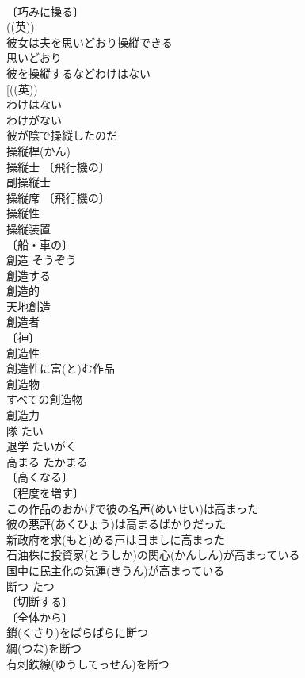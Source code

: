 \documentclass[8pt]{extreport}
\begin{document}
\begin{CJK}{UTF8}{min}
\\	〔巧みに操る〕
\\	((英)) 
\\	彼女は夫を思いどおり操縦できる 
\\	思いどおり　
\\	彼を操縦するなどわけはない
\\	[((英)) 
\\	わけはない　
\\	わけがない　
\\	彼が陰で操縦したのだ 
\\	操縦桿(かん) 
\\	操縦士 〔飛行機の〕
\\	副操縦士 
\\	操縦席 〔飛行機の〕
\\	操縦性 
\\	操縦装置 
\\	〔船・車の〕
\\	創造	そうぞう	
\\	創造する 
\\	創造的 
\\	天地創造 
\\	創造者 
\\	〔神〕
\\	創造性 
\\	創造性に富(と)む作品 
\\	創造物 
\\	すべての創造物 
\\	創造力 
\\	隊	たい	
\\	退学	たいがく	
\\	高まる	たかまる	
\\	〔高くなる〕
\\	〔程度を増す〕
\\	この作品のおかげで彼の名声(めいせい)は高まった 
\\	彼の悪評(あくひょう)は高まるばかりだった 
\\	新政府を求(もと)める声は日ましに高まった 
\\	石油株に投資家(とうしか)の関心(かんしん)が高まっている 
\\	国中に民主化の気運(きうん)が高まっている 
\\	断つ	たつ	
\\	〔切断する〕
\\	〔全体から〕
\\	鎖(くさり)をばらばらに断つ 
\\	綱(つな)を断つ 
\\	有刺鉄線(ゆうしてっせん)を断つ 

\end{CJK}
\end{document}
